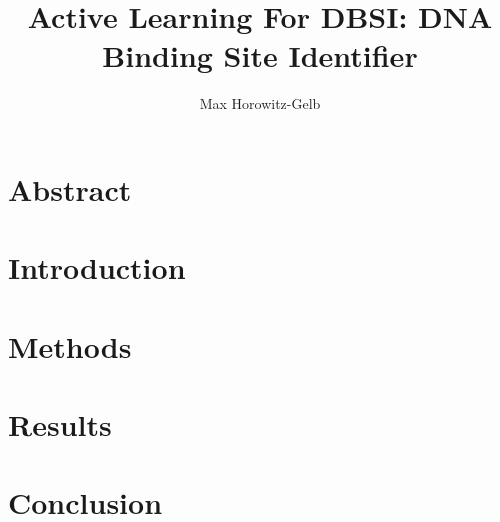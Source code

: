\documentclass{article}
\begin{document}
\author{Max Horowitz-Gelb}
\title{Active Learning For DBSI: DNA Binding Site Identifier }
\maketitle

\section*{Abstract}
\section*{Introduction}
\section*{Methods}
\section*{Results}
\section*{Conclusion}

{}

\end{document}
